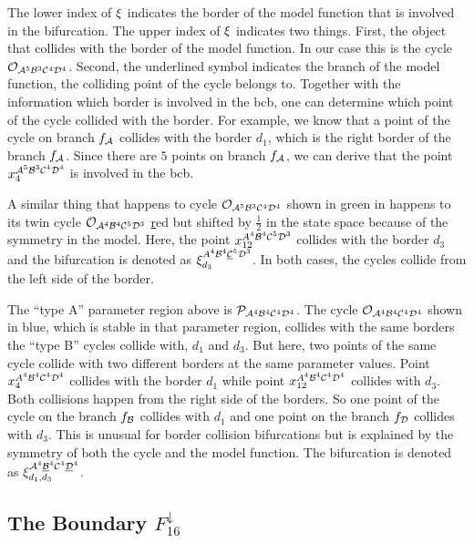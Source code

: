 
The lower index of $\xi$ indicates the border of the model function that is involved in the bifurcation.
The upper index of $\xi$ indicates two things.
First, the object that collides with the border of the model function.
In our case this is the cycle $\mathcal{O}_{\mathcal{A}^5\mathcal{B}^3\mathcal{C}^4\mathcal{D}^4}$.
Second, the underlined symbol indicates the branch of the model function, the colliding point of the cycle belongs to.
Together with the information which border is involved in the \gls{bcb}, one can determine which point of the cycle collided with the border.
For example, we know that a point of the cycle on branch $f_{\mathcal{A}}$ collides with the border $d_1$, which is the right border of the branch $f_{\mathcal{A}}$.
Since there are $5$ points on branch $f_{\mathcal{A}}$, we can derive that the point $x_4^{\mathcal{A}^5\mathcal{B}^3\mathcal{C}^4\mathcal{D}^4}$ is involved in the \gls{bcb}.

A similar thing that happens to cycle $\mathcal{O}_{\mathcal{A}^5\mathcal{B}^3\mathcal{C}^4\mathcal{D}^4}$ shown in green in  happens to its twin cycle $\mathcal{O}_{\mathcal{A}^4\mathcal{B}^4\mathcal{C}^5\mathcal{D}^3}$ \href{shown in} red but shifted by $\frac{1}{2}$ in the state space because of the symmetry in the model.
Here, the point $x_{12}^{A^4\mathcal{B}^4\mathcal{C}^5\mathcal{D}^3}$ collides with the border $d_3$ and the bifurcation is denoted as $\xi_{d_3}^{A^4\mathcal{B}^4\underline{\mathcal{C}}^5\mathcal{D}^3}$.
In both cases, the cycles collide from the left side of the border.

The ``type A'' parameter region above is $\mathcal{P}_{\mathcal{A}^4\mathcal{B}^4\mathcal{C}^4\mathcal{D}^4}$.
The cycle $\mathcal{O}_{\mathcal{A}^4\mathcal{B}^4\mathcal{C}^4\mathcal{D}^4}$ shown in blue, which is stable in that parameter region, collides with the same borders the ``type B'' cycles collide with, $d_1$ and $d_3$.
But here, two points of the same cycle collide with two different borders at the same parameter values.
Point $x_{4}^{A^4\mathcal{B}^4\mathcal{C}^4\mathcal{D}^4}$ collides with the border $d_1$ while point $x_{12}^{A^4\mathcal{B}^4\mathcal{C}^4\mathcal{D}^4}$ collides with $d_3$.
Both collisions happen from the right side of the borders.
So one point of the cycle on the branch $f_{\mathcal{B}}$ collides with $d_1$ and one point on the branch $f_{\mathcal{D}}$ collides with $d_3$.
This is unusual for border collision bifurcations but is explained by the symmetry of both the cycle and the model function.
The bifurcation is denoted as $\xi_{d_1, d_3}^{\mathcal{A}^4\underline{\mathcal{B}}^4\mathcal{C}^4\underline{\mathcal{D}}^4}$.

\subsection{The Boundary $F_{16}^\downarrow$}
\label{sec:arch.bif.D}

